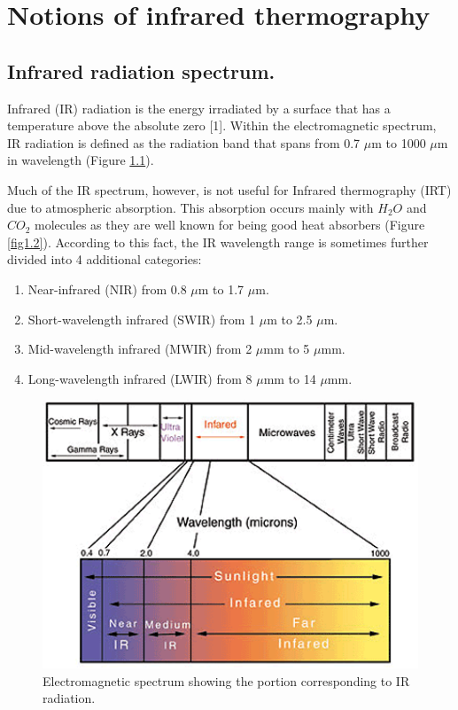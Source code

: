 \pagestyle{standard}

\chapter{Notions of infrared thermography}\label{chapter1}

	\thispagestyle{chapter-first-page}
	
	\section{Infrared radiation spectrum.}\label{section1.1}
	
		Infrared (IR) radiation is the energy irradiated by a surface that has a temperature above the absolute zero [1]. Within the electromagnetic spectrum, IR radiation is defined as the radiation band that spans from 0.7 $\mu$m to 1000 $\mu$m in wavelength (Figure \ref{fig1.1}).
		
		Much of the IR spectrum, however, is not useful for Infrared thermography (IRT) due to atmospheric absorption. This absorption occurs mainly with $H_{2}O$ and $CO_{2}$ molecules as they are well known for being good heat absorbers (Figure \ref{fig1.2}). According to this fact, the IR wavelength range is sometimes further divided into 4 additional categories:

		\begin{enumerate}[label={\Roman*.}]
			\item Near-infrared (NIR) from 0.8 $\mu$m to 1.7 $\mu$m.
			\item Short-wavelength infrared (SWIR) from 1 $\mu$m to 2.5 $\mu$m.
			\item Mid-wavelength infrared (MWIR) from 2 $\mu$mm to 5 $\mu$mm.
			\item Long-wavelength infrared (LWIR) from 8 $\mu$mm to 14 $\mu$mm.
		\end{enumerate}
		
		\begin{figure}[ht!]
			\centering
			\captionsetup{justification=centering,margin=2cm}
			\includegraphics[scale=0.75]{Figures/Chapter01/lightspectrum}
			\caption{Electromagnetic spectrum showing the portion corresponding to IR radiation.}\label{fig1.1}
		\end{figure}
		
